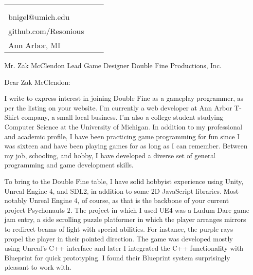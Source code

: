 \documentclass[12pt]{article}
\makeatletter
\def \address{2287 S. Main St.\\Ann Arbor, MI}
\def \author{Nigel Baillie}
\def \email{bnigel@umich.edu}
\def \phonenumber{(734) 678-5328}
\def \github{github.com/Resonious}
\makeatother
\begin{document}
\newlength{\rcollength}\setlength{\rcollength}{3.0in}%
\begin{tabular} {
  p{}
  p{}
  p{}
}
  \begin{flushleft}
    {\Huge{\author}}\\
    \vspace{1.5 mm}
  \end{flushleft}
  &
  \begin{center}
    {\phonenumber}\\
    {\email}\\
    {\github}
  \end{center}
  &
  \begin{flushright}
    {\address}
  \end{flushright}
\end{tabular}

Mr. Zak McClendon
\newline
Lead Game Designer
\newline
Double Fine Productions, Inc.
\newline

Dear Zak McClendon:
\newline

I write to express interest in joining Double Fine as a gameplay programmer,
as per the listing on your website.
I'm currently a web developer at Ann Arbor T-Shirt company, a small local business.
I'm also a college student studying Computer Science at the University of Michigan.
In addition to my professional and academic profile, I have been practicing
game programming for fun since I was sixteen and have been playing games for as
long as I can remember. Between my job, schooling, and hobby, I have developed a
diverse set of general programming and game development skills.
\newline

To bring to the Double Fine table, I have solid hobbyist experience using Unity,
Unreal Engine 4, and SDL2, in addition to some 2D JavaScript libraries.
Most notably Unreal Engine 4, of course, as that is the backbone of
your current project Psychonauts 2.
The project in which I used UE4 was a Ludum Dare game jam
entry, a side scrolling puzzle platformer in which the player arranges
mirrors to redirect beams of light with special abilities. For instance,
the purple rays propel the player in their pointed direction. The game
was developed mostly using Unreal's C++ interface and later I integrated
the C++ functionality with Blueprint for quick prototyping. I found their Blueprint
system surprisingly pleasant to work with.
\newline
\end{document}
